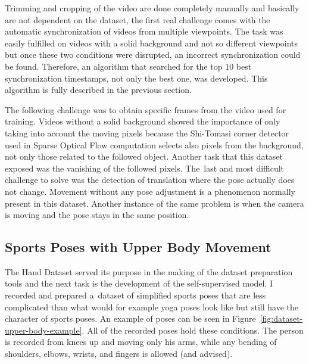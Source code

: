 Trimming and cropping of the video are done completely manually and basically are not dependent on the dataset, the first real challenge comes with the automatic synchronization of videos from multiple viewpoints. The task was easily fulfilled on videos with a solid background and not so different viewpoints but once these two conditions were disrupted, an incorrect synchronization could be found. Therefore, an algorithm that searched for the top 10 best synchronization timestamps, not only the best one, was developed. This algorithm is fully described in the previous section.

The following challenge was to obtain specific frames from the video used for training. Videos without a solid background showed the importance of only taking into account the moving pixels because the Shi-Tomasi corner detector used in Sparse Optical Flow computation selects also pixels from the background, not only those related to the followed object. Another task that this dataset exposed was the vanishing of the followed pixels. The~last and most difficult challenge to solve was the detection of translation where the pose actually does not change. Movement without any pose adjustment is a phenomenon normally present in this dataset. Another instance of the same problem is when the camera is moving and the pose stays in the same position.

\subsection{\label{sec:dataset-upper-body}Sports Poses with Upper Body Movement}

The Hand Dataset served its purpose in the making of the dataset preparation tools and the next task is the development of the self-supervised model. I recorded and prepared a~dataset of simplified sports poses that are less complicated than what would for example yoga poses look like but still have the character of sports poses. An example of poses can be seen in Figure~\ref{fig:dataset-upper-body-example}. All of the recorded poses hold these conditions. The person is recorded from knees up and moving only his arms, while any bending of shoulders, elbows, wrists, and fingers is allowed (and advised).


